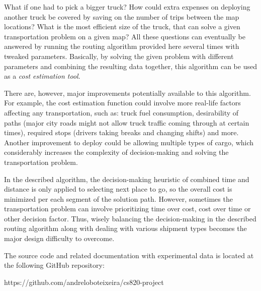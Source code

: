 \documentclass[journal,onecolumn]{IEEEtran}
\begin{document}
What if one had to pick a bigger truck? How could extra expenses on deploying another truck be covered by saving on the number of trips between the map locations? What is the most efficient size of the truck, that can solve a given transportation problem on a given map? All these questions can eventually be answered by running the routing algorithm provided here several times with tweaked parameters. Basically, by solving the given problem with different parameters and combining the resulting data together, this algorithm can be used as a \textit{cost estimation tool}.

There are, however, major improvements potentially available to this algorithm. For example, the cost estimation function could involve more real-life factors affecting any transportation, such as: truck fuel consumption, desirability of paths (major city roads might not allow truck traffic coming through at certain times), required stops (drivers taking breaks and changing shifts) and more. Another improvement to deploy could be allowing multiple types of cargo, which considerably increases the complexity of decision-making and solving the transportation problem.

In the described algorithm, the decision-making heuristic of combined time and distance is only applied to selecting next place to go, so the overall cost is minimized per each segment of the solution path. However, sometimes the transportation problem can involve prioritizing time over cost, cost over time or other decision factor. Thus, wisely balancing the decision-making in the described routing algorithm along with dealing with various shipment types becomes the major design difficulty to overcome. 

The source code and related documentation with experimental data is located at the following GitHub repository:\\ 
\begin{center}
https://github.com/andreloboteixeira/cs820-project 
\end{center}








\end{document}
